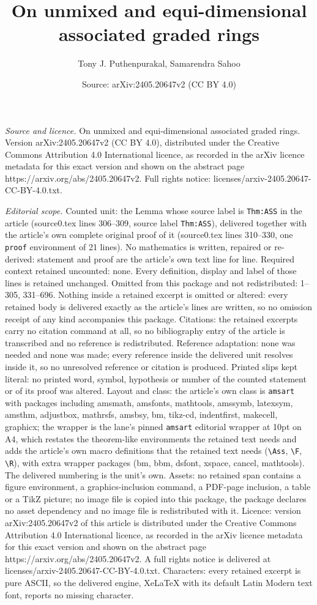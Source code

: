 \documentclass[10pt,a4paper]{amsart}
\title[On unmixed and equi-dimensional associated graded rings]{On unmixed and equi-dimensional associated graded rings}
\author{Tony J. Puthenpurakal, Samarendra Sahoo}
\date{Source: arXiv:2405.20647v2 (CC BY 4.0)}
\begin{document}
\maketitle

\noindent\emph{Source and licence.} On unmixed and equi-dimensional associated graded rings. Version arXiv:2405.20647v2 (CC BY 4.0), distributed under the Creative Commons Attribution 4.0 International licence, as recorded in the arXiv licence metadata for this exact version and shown on the abstract page https://arxiv.org/abs/2405.20647v2. Full rights notice: licenses/arxiv-2405.20647-CC-BY-4.0.txt.\par\smallskip

\noindent\textit{Editorial scope.} Counted unit: the Lemma whose source label is \texttt{Thm:ASS} in the article (source0.tex lines 306--309, source label \texttt{Thm:ASS}), delivered together with the article's own complete original proof of it (source0.tex lines 310--330, one \texttt{proof} environment of 21 lines). No mathematics is written, repaired or re-derived: statement and proof are the article's own text line for line. Required context retained uncounted: none. Every definition, display and label of those lines is retained unchanged. Omitted from this package and not redistributed: 1--305, 331--696. Nothing inside a retained excerpt is omitted or altered: every retained body is delivered exactly as the article's lines are written, so no omission receipt of any kind accompanies this package. Citations: the retained excerpts carry no citation command at all, so no bibliography entry of the article is transcribed and no reference is redistributed. Reference adaptation: none was needed and none was made; every reference inside the delivered unit resolves inside it, so no unresolved reference or citation is produced. Printed slips kept literal: no printed word, symbol, hypothesis or number of the counted statement or of its proof was altered. Layout and class: the article's own class is \texttt{amsart} with packages including amsmath, amsfonts, mathtools, amssymb, latexsym, amsthm, adjustbox, mathrsfs, amsbsy, bm, tikz-cd, indentfirst, makecell, graphicx; the wrapper is the lane's pinned \texttt{amsart} editorial wrapper at 10pt on A4, which restates the theorem-like environments the retained text needs and adds the article's own macro definitions that the retained text needs (\texttt{\textbackslash Ass}, \texttt{\textbackslash F}, \texttt{\textbackslash R}), with extra wrapper packages (bm, bbm, dsfont, xspace, cancel, mathtools). The delivered numbering is the unit's own. Assets: no retained span contains a figure environment, a graphics-inclusion command, a PDF-page inclusion, a table or a TikZ picture; no image file is copied into this package, the package declares no asset dependency and no image file is redistributed with it. Licence: version arXiv:2405.20647v2 of this article is distributed under the Creative Commons Attribution 4.0 International licence, as recorded in the arXiv licence metadata for this exact version and shown on the abstract page https://arxiv.org/abs/2405.20647v2. A full rights notice is delivered at licenses/arxiv-2405.20647-CC-BY-4.0.txt. Characters: every retained excerpt is pure ASCII, so the delivered engine, XeLaTeX with its default Latin Modern text font, reports no missing character.
\end{document}
